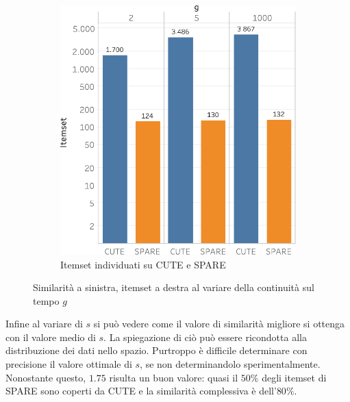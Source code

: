 \begin{figure}
\begin{subfigure}{.5\textwidth}
   \includegraphics[scale=0.6]{res/fig/sec-4/scalability/ComparisonGCUTESPARE.pdf}
  \caption{Itemset individuati su CUTE e SPARE}%
  \end{subfigure}%
  \caption{Similarità a sinistra, itemset a destra al variare della continuità sul tempo \(g\)}%
  \label{fig:chap-4:CompG}
\end{figure}

Infine al variare di \(s\) si può vedere come il valore di similarità migliore si ottenga con il valore medio di \(s\).
La spiegazione di ciò può essere ricondotta alla distribuzione dei dati nello spazio.
Purtroppo è difficile determinare con precisione il valore ottimale di \(s\), se non determinandolo sperimentalmente.
Nonostante questo, \(1.75\) risulta un buon valore: quasi il \(50\%\) degli itemset di SPARE sono coperti da CUTE e la similarità complessiva è dell'\(80\%\). 

